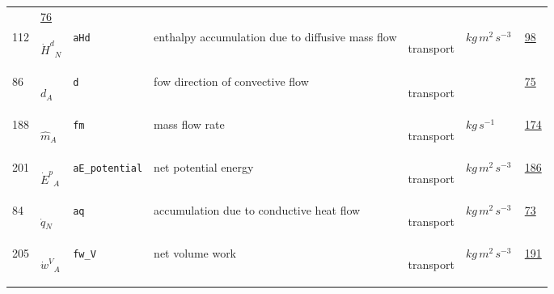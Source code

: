 \begin{longtable}{|p{1cm}|p{2.5cm}|p{4.5cm}|p{8cm}|p{3.0cm}|p{3cm}|p{1cm}|}
             &                 \hyperlink{"e:76"}{ 76 }
                 \\
            112
             & \hypertarget{"v:112"}{ $ {{\dot{H}^d}}{_{N}} $}
             & \verb|aHd|
             & enthalpy accumulation due to diffusive mass flow
             & \begin{lay}transport \end{lay}
             & $ kg \,m^{2} \,s^{-3} \, $
             &                 \hyperlink{"e:98"}{ 98 }
                 \\
            86
             & \hypertarget{"v:86"}{ $ {d}{_{A}} $}
             & \verb|d|
             & fow direction of convective flow
             & \begin{lay}transport \end{lay}
             & $  $
             &                 \hyperlink{"e:75"}{ 75 }
                 \\
            188
             & \hypertarget{"v:188"}{ $ {{\hat{m}}}{_{A}} $}
             & \verb|fm|
             & mass flow rate 
             & \begin{lay}transport \end{lay}
             & $ kg \,s^{-1} \, $
             &                 \hyperlink{"e:174"}{ 174 }
                 \\
            201
             & \hypertarget{"v:201"}{ $ {{\dot{E}^p}}{_{A}} $}
             & \verb|aE_potential|
             & net potential energy
             & \begin{lay}transport \end{lay}
             & $ kg \,m^{2} \,s^{-3} \, $
             &                 \hyperlink{"e:186"}{ 186 }
                 \\
            84
             & \hypertarget{"v:84"}{ $ {{\dot{q}}}{_{N}} $}
             & \verb|aq|
             & accumulation due to conductive heat flow
             & \begin{lay}transport \end{lay}
             & $ kg \,m^{2} \,s^{-3} \, $
             &                 \hyperlink{"e:73"}{ 73 }
                 \\
            205
             & \hypertarget{"v:205"}{ $ {{\dot{w}^V}}{_{A}} $}
             & \verb|fw_V|
             & net volume work
             & \begin{lay}transport \end{lay}
             & $ kg \,m^{2} \,s^{-3} \, $
             &                 \hyperlink{"e:191"}{ 191 }

\end{longtable}

